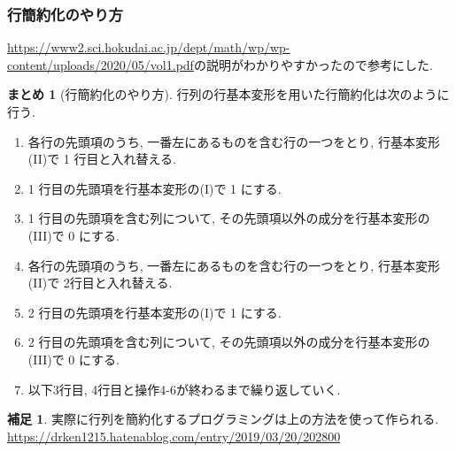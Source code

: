 \documentclass[dvipdfmx,a4paper,11pt]{article} %
\theoremstyle{definition}
\newtheorem{rem}[thm]{補足}
\newtheorem{suma}[thm]{まとめ}
\begin{document}
 
 \subsubsection{行簡約化のやり方}
 
 
\url{https://www2.sci.hokudai.ac.jp/dept/math/wp/wp-content/uploads/2020/05/vol1.pdf}の説明がわかりやすかったので参考にした. 

\begin{tcolorbox}[
    colback = white,
    colframe = green!35!black,
    fonttitle = \bfseries,
    breakable = true]
        \begin{suma}[行簡約化のやり方]
\label{suma-gyokanyaku}
行列の行基本変形を用いた行簡約化は次のように行う.
\begin{enumerate}[label=\textbf{操作}\arabic*.]
    \setlength{\parskip}{0cm} 
  \setlength{\itemsep}{0cm}
 \item 各行の先頭項のうち, 一番左にあるものを含む行の一つをとり, 行基本変形(II)で 1 行目と入れ替える. 
\item 1 行目の先頭項を行基本変形の(I)で 1 にする.
\item 1 行目の先頭項を含む列について, その先頭項以外の成分を行基本変形の(III)で 0 にする.
\item 各行の先頭項のうち, 一番左にあるものを含む行の一つをとり, 行基本変形(II)で 2行目と入れ替える. 
\item 2 行目の先頭項を行基本変形の(I)で 1 にする.
\item 2 行目の先頭項を含む列について, その先頭項以外の成分を行基本変形の(III)で 0 にする.
\item 以下3行目, 4行目と操作4-6が終わるまで繰り返していく. 
 \end{enumerate}
\end{suma}
 \end{tcolorbox}



\begin{rem}
実際に行列を簡約化するプログラミングは上の方法を使って作られる.  \url{https://drken1215.hatenablog.com/entry/2019/03/20/202800}
\end{rem}
 
\end{document}
